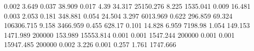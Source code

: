 0.002      3.649      %
0.037      38.909     %
0.017      4.39       %
34.317     25150.276  %
8.225      1535.041   %
0.009      16.481     %
0.003      2.053      %
0.181      348.881    %
0.054      24.504     %
3.297      6013.969   %
0.622      296.859    %
69.324     106306.715 %
9.158      3466.959   %
0.455      628.17     %
0.101      14.828     %
6.959      7198.98    %
1.054      149.153    %
1471.989   200000     %
153.989    15553.814  %
0.001      0.001      %
1547.244   200000     %
0.001      0.001      %
15947.485  200000     %
0.002      3.226      %
0.001      0.257      %
1.761      1747.666   %

